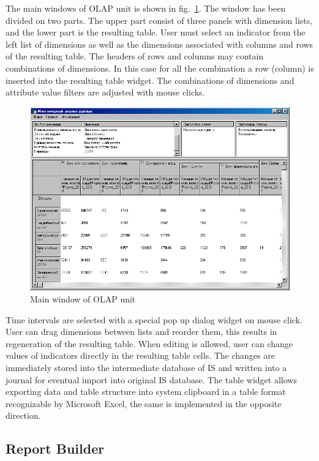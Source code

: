 \documentclass[conference]{IEEEtran}
\begin{document}
The main windows of OLAP unit is shown in fig.~\ref{fig:olapu}.  The window has been divided on two parts.  The upper part consist of three panels with dimension lists, and the lower part is the resulting table.  User must select an indicator from the left list of dimensions as well as the dimensions associated with columns and rows of the resulting table.  The headers of rows and columns may contain combinations of dimensions.  In this case for all the combination a row (column) is inserted into the resulting table widget.  The combinations of dimensions and attribute value filters are adjusted with mouse clicks.

\begin{figure}[t]
  \centering
  \includegraphics[width=\linewidth]{MDA-olap.png}
  \caption{Main window of OLAP unit}
  \label{fig:olapu}
\end{figure}

Time intervals are selected with a special pop up dialog widget on mouse click.  User can drag dimensions between lists and reorder them, this results in regeneration of the resulting table.  When editing is allowed, user can change values of indicators directly in the resulting table cells.  The changes are immediately stored into the intermediate database of IS and written into a journal for eventual import into original IS database.  The table widget allows exporting data and table structure into system clipboard in a table format recognizable by Microsoft Excel, the same is implemented in the opposite direction.

\subsection{Report Builder}
\label{sec:report-builder}
\end{document}
